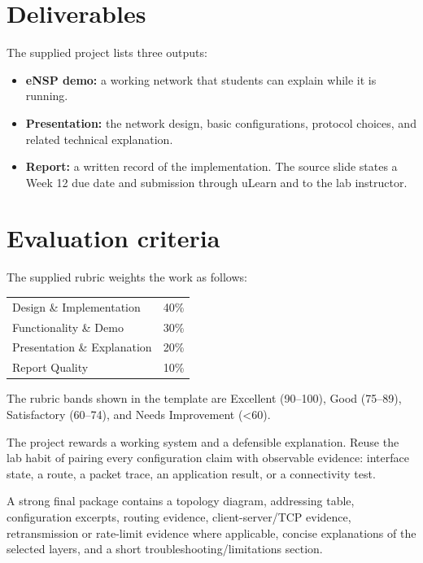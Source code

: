 \section*{Deliverables}
The supplied project lists three outputs:
\begin{itemize}
\item \textbf{eNSP demo:} a working network that students can explain while it is running.
\item \textbf{Presentation:} the network design, basic configurations, protocol choices, and related technical explanation.
\item \textbf{Report:} a written record of the implementation. The source slide states a Week 12 due date and submission through uLearn and to the lab instructor.
\end{itemize}

\section*{Evaluation criteria}
The supplied rubric weights the work as follows:
\begin{center}\begin{tabular}{lr}\toprule
Design \& Implementation & 40\%\\
Functionality \& Demo & 30\%\\
Presentation \& Explanation & 20\%\\
Report Quality & 10\%\\\bottomrule
\end{tabular}\end{center}
The rubric bands shown in the template are Excellent (90--100), Good (75--89), Satisfactory (60--74), and Needs Improvement (<60).


\begin{keyidea}
The project rewards a working system and a defensible explanation. Reuse the lab habit of pairing every configuration claim with observable evidence: interface state, a route, a packet trace, an application result, or a connectivity test.
\end{keyidea}

\begin{labdeliverable}
A strong final package contains a topology diagram, addressing table, configuration excerpts, routing evidence, client-server/TCP evidence, retransmission or rate-limit evidence where applicable, concise explanations of the selected layers, and a short troubleshooting/limitations section.
\end{labdeliverable}
